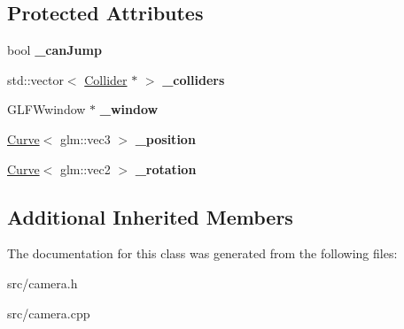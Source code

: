 \subsection*{Protected Attributes}
\begin{DoxyCompactItemize}
\item 
\hypertarget{class_player_camera_a42928613b1630cb4ae4d0607ac97b245}{}bool {\bfseries \+\_\+can\+Jump}\label{class_player_camera_a42928613b1630cb4ae4d0607ac97b245}

\item 
\hypertarget{class_player_camera_a883b822fa2ad7dfbc12551db76fbee9e}{}std\+::vector$<$ \hyperlink{class_collider}{Collider} $\ast$ $>$ {\bfseries \+\_\+colliders}\label{class_player_camera_a883b822fa2ad7dfbc12551db76fbee9e}

\item 
\hypertarget{class_player_camera_a3c8a4894c9863274e696973c2e303e78}{}G\+L\+F\+Wwindow $\ast$ {\bfseries \+\_\+window}\label{class_player_camera_a3c8a4894c9863274e696973c2e303e78}

\item 
\hypertarget{class_player_camera_a1d23e13334832fb7ad78fff02e987feb}{}\hyperlink{class_curve}{Curve}$<$ glm\+::vec3 $>$ {\bfseries \+\_\+position}\label{class_player_camera_a1d23e13334832fb7ad78fff02e987feb}

\item 
\hypertarget{class_player_camera_a43bfc21e3f1d0f3f95f509f5a0f4aed4}{}\hyperlink{class_curve}{Curve}$<$ glm\+::vec2 $>$ {\bfseries \+\_\+rotation}\label{class_player_camera_a43bfc21e3f1d0f3f95f509f5a0f4aed4}

\end{DoxyCompactItemize}
\subsection*{Additional Inherited Members}


The documentation for this class was generated from the following files\+:\begin{DoxyCompactItemize}
\item 
src/camera.\+h\item 
src/camera.\+cpp\end{DoxyCompactItemize}
